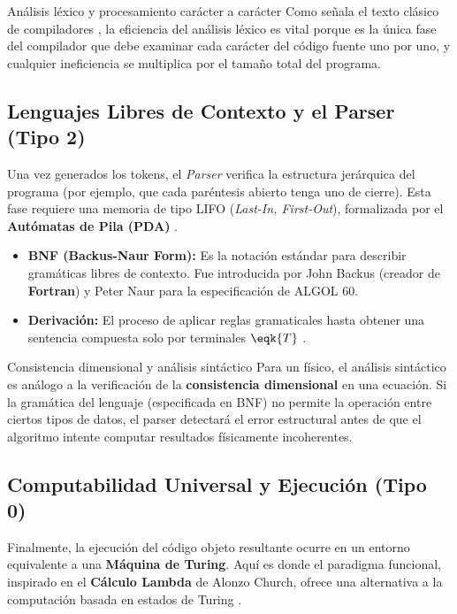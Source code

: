 \begin{observacion}{Análisis léxico y procesamiento carácter a carácter}
Como señala el texto clásico de compiladores \cite{aho2006compilers}, la eficiencia del análisis léxico es vital porque es la única fase del compilador que debe examinar cada carácter del código fuente uno por uno, y cualquier ineficiencia se multiplica por el tamaño total del programa.
\end{observacion}

\subsection{Lenguajes Libres de Contexto y el Parser (Tipo 2)}

Una vez generados los tokens, el \textit{Parser} verifica la estructura jerárquica del programa (por ejemplo, que cada paréntesis abierto tenga uno de cierre). Esta fase requiere una memoria de tipo LIFO (\textit{Last-In, First-Out}), formalizada por el \textbf{Autómatas de Pila (PDA)} \cite{aho2006compilers,sipser2012introduction}.

\begin{itemize}
    \item \textbf{BNF (Backus-Naur Form):} Es la notación estándar para describir gramáticas libres de contexto. Fue introducida por John Backus (creador de \textbf{Fortran}) y Peter Naur para la especificación de ALGOL 60.
    \item \textbf{Derivación:} El proceso de aplicar reglas gramaticales hasta obtener una sentencia compuesta solo por terminales $\eqk{T}$ \cite{aho2006compilers}.
\end{itemize}

\begin{fisicaconexion}{Consistencia dimensional y análisis sintáctico}
Para un físico, el análisis sintáctico es análogo a la verificación de la \textbf{consistencia dimensional} en una ecuación. Si la gramática del lenguaje (especificada en BNF) no permite la operación entre ciertos tipos de datos, el parser detectará el error estructural antes de que el algoritmo intente computar resultados físicamente incoherentes.
\end{fisicaconexion}

\subsection{Computabilidad Universal y Ejecución (Tipo 0)}

Finalmente, la ejecución del código objeto resultante ocurre en un entorno equivalente a una \textbf{Máquina de Turing}. Aquí es donde el paradigma funcional, inspirado en el \textbf{Cálculo Lambda} de Alonzo Church, ofrece una alternativa a la computación basada en estados de Turing \cite{sipser2012introduction}.

